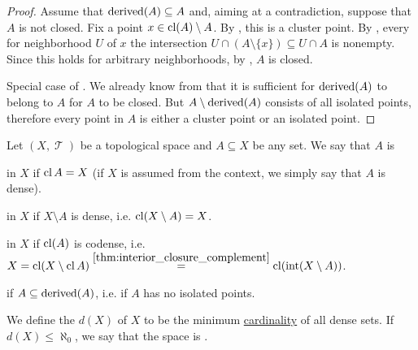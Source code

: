 \begin{proof}
   Assume that \( \operatorname{derived}(A) \subseteq A \) and, aiming at a contradiction, suppose that \( A \) is not closed. Fix a point \( x \in \operatorname{cl}(A) \setminus A \). By , this is a cluster point. By , every for neighborhood \( U \) of \( x \) the intersection \( U \cap (A \setminus \{ x \}) \subseteq U \cap A \) is nonempty. Since this holds for arbitrary neighborhoods, by , \( A \) is closed.

  Special case of .
   We already know from  that it is sufficient for \( \operatorname{derived}(A) \) to belong to \( A \) for \( A \) to be closed. But \( A \setminus \operatorname{derived}(A) \) consists of all isolated points, therefore every point in \( A \) is either a cluster point or an isolated point.
\end{proof}

\begin{definition}\label{def:topologically_dense_set}\mcite\cite[25]{Engelking1989}
  Let \( (X, \mscrT) \) be a topological space and \( A \subseteq X \) be any set. We say that \( A \) is

  \begin{thmenum}
      in \( X \) if \( \operatorname{cl}{A} = X \) (if \( X \) is assumed from the context, we simply say that \( A \) is dense).

      in \( X \) if \( X \setminus A \) is dense, i.e. \( \operatorname{cl}(X \setminus A) = X \).

      in \( X \) if \( \operatorname{cl}(A) \) is codense, i.e. \( X = \operatorname{cl}(X \setminus \operatorname{cl} A) \overset {\ref{thm:interior_closure_complement}} = \operatorname{cl}(\operatorname{int}(X \setminus A)) \).

      if \( A \subseteq \operatorname{derived}(A) \), i.e. if \( A \) has no isolated points.
  \end{thmenum}

  We define the  \( d(X) \) of \( X \) to be the minimum \hyperref[def:cardinal]{cardinality} of all dense sets. If \( d(X) \leq \aleph_0 \), we say that the space is .
\end{definition}

